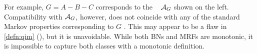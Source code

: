 For example, 
$G = A{-}B{-}C$
corresponds to the \hgraph\ 
\commentout{
\[
    \Ar_{G} = \Bigg\{
            \begin{array}{r@{}l} \{B\}&{\to}\{A\},\\ \{A,C\}&{\to}\{B\},\\ \{B\}&{\to}\{C\}
            \end{array}\Bigg\}
    =     \begin{tikzpicture}[center base]
        \node[dpad1] (A) at (-0.6,0) {$A$};
        \node[dpad1] (B) at (0,1) {$B$};
        \node[dpad1] (C) at (0.6,0) {$C$};

        \draw[arr2,<-] (A) -- (B);
        \draw[arr2,<-] (C) -- (B);
        \mergearr[arr2] ACB
    \end{tikzpicture}
    ~.
\]
}
$\mathcal A_G$ shown on the left.
% 
Compatibility
with $\mathcal A_G$, however, does not coincide with any of the standard Markov properties
corresponding to $G$ \citep{koller2009probabilistic}.
%
This may appear to be a flaw in \cref{defn:qim} (\scibility), but it is unavoidable.  
While both BNs and MRFs are monotonic, it is impossible to capture both classes with a monotonic definition.

